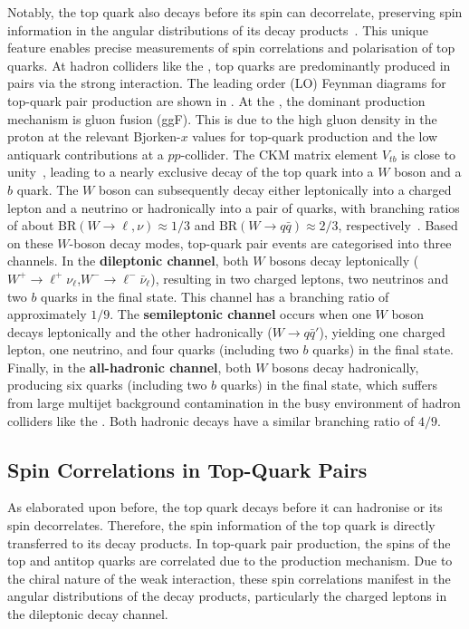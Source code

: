 Notably, the top quark also decays before its spin can decorrelate, preserving spin information in the angular distributions of its decay products~\cite{spin_decorrelation_time}. This unique feature enables precise measurements of spin correlations and polarisation of top quarks.
At hadron colliders like the \lhc, top quarks are predominantly produced in pairs via the strong interaction.
The leading order (LO) Feynman diagrams for top-quark pair production are shown in .
At the \lhc, the dominant production mechanism is gluon fusion (ggF).
This is due to the high gluon density in the proton at the relevant Bjorken-$x$ values for top-quark production and the low antiquark contributions at a $pp$-collider.
The CKM matrix element $V_{tb}$ is close to unity~\cite{PDG2024}, leading to a nearly exclusive decay of the top quark into a $W$ boson and a $b$ quark.
The $W$ boson can subsequently decay either leptonically into a charged lepton and a neutrino or hadronically into a pair of quarks, with branching ratios of about $\text{BR}(W\to\ell,\nu)\approx1/3$ and $\text{BR}(W\to q\bar{q})\approx2/3$, respectively~\cite{PDG2024}.
Based on these $W$-boson decay modes, top-quark pair events are categorised into three channels. In the \textbf{dileptonic channel}, both $W$ bosons decay leptonically ($W^+ \to \ell^+ \nu_\ell$,$W^- \to \ell^-\bar{\nu}_\ell$), resulting in two charged leptons, two neutrinos and two $b$ quarks in the final state. This channel has a branching ratio of approximately $1/9$. The \textbf{semileptonic channel} occurs when one $W$ boson decays leptonically and the other hadronically ($W \to q\bar{q}'$), yielding one charged lepton, one neutrino, and four quarks (including two $b$ quarks) in the final state. Finally, in the \textbf{all-hadronic channel}, both $W$ bosons decay hadronically, producing six quarks (including two $b$ quarks) in the final state, which suffers from large multijet background contamination in the busy environment of hadron colliders like the \lhc. Both hadronic decays have a similar branching ratio of $4/9$.


\subsection{Spin Correlations in Top-Quark Pairs}
\label{sec:ttbar_entanglement}
As elaborated upon before, the top quark decays before it can hadronise or its spin decorrelates. Therefore, the spin information of the top quark is directly transferred to its decay products. In top-quark pair production, the spins of the top and antitop quarks are correlated due to the production mechanism. Due to the chiral nature of the weak interaction, these spin correlations manifest in the angular distributions of the decay products, particularly the charged leptons in the dileptonic decay channel.

